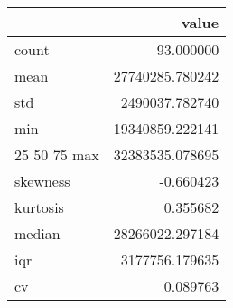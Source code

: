 \begin{tabular}{lr}
\toprule
 & value \\
\midrule
count & 93.000000 \\
mean & 27740285.780242 \\
std & 2490037.782740 \\
min & 19340859.222141 \\
25%
50%
75%
max & 32383535.078695 \\
skewness & -0.660423 \\
kurtosis & 0.355682 \\
median & 28266022.297184 \\
iqr & 3177756.179635 \\
cv & 0.089763 \\
\bottomrule
\end{tabular}
